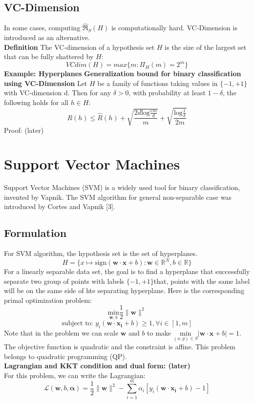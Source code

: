 \documentclass[12pt]{article}
\theoremstyle{definition}
\theoremstyle{remark}
\numberwithin{equation}{section}
\begin{document}
\subsection{VC-Dimension}
In some cases, computing $\mathfrak{\widehat{R}}_S(H)$ is computationally hard. VC-Dimension is introduced as an alternative. \\[0.2cm]
\textbf{Definition}
The VC-dimension of a hypothesis set $H$ is the size of the largest set that can be fully shattered by $H$:
\[VCdim(H) = max\{m:\Pi_H(m) = 2^m\}\]
\textbf{Example: Hyperplanes}
\textbf{Generalization bound for binary classification using VC-Dimension}
Let $H$ be a family of functions taking values in $\{-1,+1\}$ with VC-dimension d. Then for any $\delta > 0$, with probability at least $1-\delta$, the following holds for all $h \in H$:
\[R(h) \leq \widehat{R}(h) + \sqrt{\frac{2d\mathrm{log}\frac{em}{d}}{m}} + \sqrt{\frac{\mathrm{log}\frac{1}{\delta}}{2m}}\]
Proof: (later) 
\section{Support Vector Machines}
Support Vector Machines (SVM) is a widely used tool for binary classification, invented by Vapnik. The SVM algorithm for general non-separable case was introduced by Cortes and Vapnik [3].  
\subsection{Formulation}
For SVM algorithm, the hypothesis set is the set of hyperplanes.
\[H = \{x\mapsto \mathrm{sign}(\mathbf{w\cdot x}+b): \mathbf{w} \in \mathbb{R}^N, b \in \mathbb{R} \}\] 
For a linearly separable data set, the goal is to find a hyperplane that successfully separate two group of points with labels $\{-1,+1\}$that, points with the same label will be on the same side of hte separating hyperplane. Here is the corresponding primal optimization problem: 
\[\underset{\mathbf{w}, b}{\mathrm{min}} \frac{1}{2}\|\mathbf{w}\|^2\]
\[\text{subject to: } y_i(\mathbf{w\cdot x_i}+b) \geq 1, \forall i \in [1,m]\] 
Note that in the problem we can scale $\mathbf{w}$ and $b$ to make $\underset{(x,y)\in S}{\mathrm{min}}|\mathbf{w\cdot x}+b| =1 $.
The objective function is quadratic and the constraint is affine. This problem belongs to quadratic programming (QP). \\[0.2cm]
\textbf{Lagrangian and KKT condition and dual form: (later)} \\[0.2cm]
For this problem, we can write the Lagrangian:
\[\mathcal{L}(\mathbf{w},b,\mathbf{\alpha})=\frac{1}{2}\|\mathbf{w}\|^2-\sum_{i=1}^{m}\alpha_i [y_i(\mathbf{w\cdot x_i}+b)-1]\]
\end{document}
